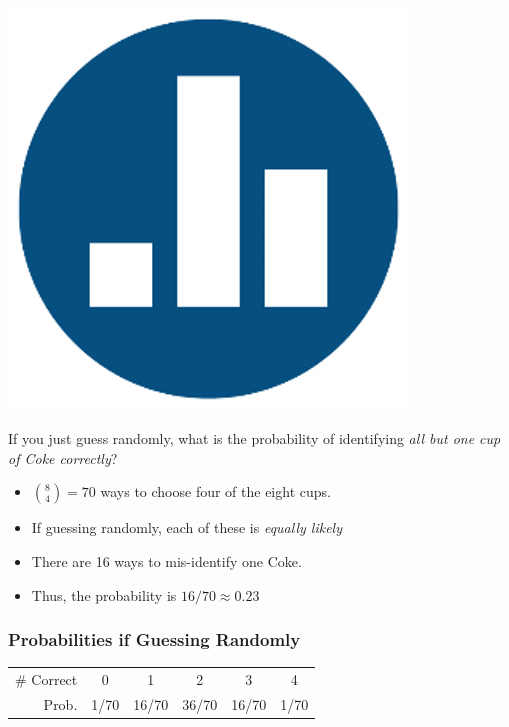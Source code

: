 \documentclass[handout]{beamer}
\begin{document}
\begin{frame}
\frametitle{\includegraphics[scale = 0.05]{./images/clicker}}
If you just guess randomly, what is the probability of identifying \emph{all but one cup of Coke correctly}?
\pause
\begin{itemize}
\item ${8\choose 4}=70$ ways to choose four of the eight cups. \pause
\item If guessing randomly, each of these is \emph{\alert{equally likely}} \pause
\item There are 16 ways to mis-identify one Coke.%
\item Thus, the probability is $16/70 \approx 0.23$
\end{itemize}
\end{frame}
\begin{frame}
\frametitle{Probabilities if Guessing Randomly}
	\begin{center}
		\begin{tabular}{rccccc}
		\hline
		\# Correct & 0 & 1 & 2 & 3 & 4\\
		Prob.&1/70 & 16/70 & 36/70 & 16/70 &1/70\\
		\hline
		\end{tabular}
	\end{center}
\end{frame}
\end{document}

